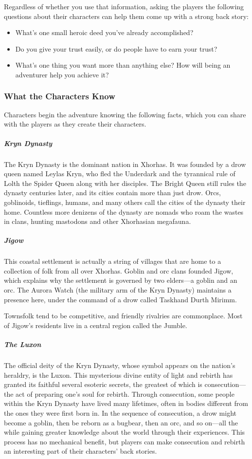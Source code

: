 \documentclass[10pt,a4paper,twoside,bg=print,twocolumn,openany,nodeprecatedcode]{dndbook}
\begin{document}
Regardless of whether you use that information, asking the players the following questions about their characters can help them come up with a strong back story:


\begin{itemize}
\item What's one small heroic deed you've already accomplished?
\item Do you give your trust easily, or do people have to earn your trust?
\item What's one thing you want more than anything else? How will being an adventurer help you achieve it?
\end{itemize}

\subsubsection{What the Characters Know}
Characters begin the adventure knowing the following facts, which you can share with the players as they create their characters.

\subparagraph{Kryn Dynasty}
The Kryn Dynasty is the dominant nation in Xhorhas. It was founded by a drow queen named Leylas Kryn, who fled the Underdark and the tyrannical rule of Lolth the Spider Queen along with her disciples. The Bright Queen still rules the dynasty centuries later, and its cities contain more than just drow. Orcs, goblinoids, tieflings, humans, and many others call the cities of the dynasty their home. Countless more denizens of the dynasty are nomads who roam the wastes in clans, hunting mastodons and other Xhorhasian megafauna.

\subparagraph{Jigow}
This coastal settlement is actually a string of villages that are home to a collection of folk from all over Xhorhas. Goblin and orc clans founded Jigow, which explains why the settlement is governed by two elders—a goblin and an orc. The Aurora Watch (the military arm of the Kryn Dynasty) maintains a presence here, under the command of a drow called Taskhand Durth Mirimm.

Townsfolk tend to be competitive, and friendly rivalries are commonplace. Most of Jigow's residents live in a central region called the Jumble.

\subparagraph{The Luxon}
The official deity of the Kryn Dynasty, whose symbol appears on the nation's heraldry, is the Luxon. This mysterious divine entity of light and rebirth has granted its faithful several esoteric secrets, the greatest of which is consecution—the act of preparing one's soul for rebirth. Through consecution, some people within the Kryn Dynasty have lived many lifetimes, often in bodies different from the ones they were first born in. In the sequence of consecution, a drow might become a goblin, then be reborn as a bugbear, then an orc, and so on—all the while gaining greater knowledge about the world through their experiences. This process has no mechanical benefit, but players can make consecution and rebirth an interesting part of their characters' back stories.
\end{document}
